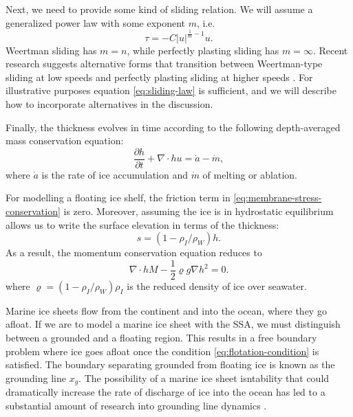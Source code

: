 \documentclass[twocolumn,letterpaper]{igs}
\begin{document}
Next, we need to provide some kind of sliding relation.
We will assume a generalized power law with some exponent $m$, i.e.
\begin{equation}
    \tau = -C|u|^{\frac{1}{m} - 1}u.
    \label{eq:sliding-law}
\end{equation}
Weertman sliding has $m = n$, while perfectly plasting sliding has $m = \infty$.
Recent research suggests alternative forms that transition between Weertman-type sliding at low speeds and perfectly plasting sliding at higher speeds \citep{minchew2020toward}.
For illustrative purposes equation \eqref{eq:sliding-law} is sufficient, and we will describe how to incorporate alternatives in the discussion.

Finally, the thickness evolves in time according to the following depth-averaged mass conservation equation:
\begin{equation}
    \frac{\partial h}{\partial t} + \nabla \cdot hu = \dot a - \dot m,
    \label{eq:conservation-mass}
\end{equation}
where $\dot a$ is the rate of ice accumulation and $\dot m$ of melting or ablation.

For modelling a floating ice shelf, the friction term in \eqref{eq:membrane-stress-conservation} is zero.
Moreover, assuming the ice is in hydrostatic equilibrium allows us to write the surface elevation in terms of the thickness:
\begin{equation}
    s = (1 - \rho_I / \rho_W) h.
    \label{eq:flotation-condition}
\end{equation}
As a result, the momentum conservation equation reduces to
\begin{equation}
    \nabla\cdot hM - \frac{1}{2}\varrho g\nabla h^2 = 0.
\end{equation}
where $\varrho = (1 - \rho_I / \rho_W)\rho_I$ is the reduced density of ice over seawater.

Marine ice sheets flow from the continent and into the ocean, where they go afloat.
If we are to model a marine ice sheet with the SSA, we must distinguish between a grounded and a floating region.
This results in a free boundary problem where ice goes afloat once the condition \eqref{eq:flotation-condition} is satisfied.
The boundary separating grounded from floating ice is known as the grounding line $x_g$.
The possibility of a marine ice sheet isntability that could dramatically increase the rate of discharge of ice into the ocean has led to a substantial amount of research into grounding line dynamics \citep{schoof2007mis, durand2009mis, favier2012mis}.
\end{document}
